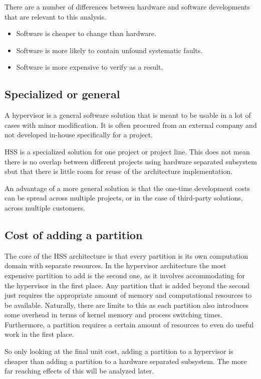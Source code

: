 There are a number of differences between hardware and software developments that are relevant to this analysis.
\begin{itemize}
\item Software is cheaper to change than hardware. 
\item Software is more likely to contain unfound systematic faults.
\item Software is more expensive to verify as a result.
\end{itemize}
\subsection{Specialized or general}
A hypervisor is a general software solution that is meant to be usable in a lot of cases with minor modification. It is often procured from an external company and not developed in-house specifically for a project.

\gls{HSS} is a specialized solution for one project or project line. This does not mean there is no overlap between different projects using hardware separated subsystem sbut that there is little room for reuse of the architecture implementation.

An advantage of a more general solution is that the one-time development costs can be spread across multiple projects, or in the case of third-party solutions, across multiple customers.   
\subsection{Cost of adding a partition}
The core of the \gls{HSS} architecture is that every partition is its own computation domain with separate resources. In the hypervisor architecture the most expensive partition to add is the second one, as it involves accommodating for the hypervisor in the first place. Any partition that is added beyond the second just requires the appropriate amount of memory and computational resources to be available. Naturally, there are limits to this as each partition also introduces some overhead in terms of kernel memory and process switching times.  Furthermore, a partition requires a certain amount of resources to even do useful work in the first place.

So only looking at the final unit cost, adding a partition to a hypervisor is cheaper than adding a partition to a hardware separated subsystem. The more far reaching effects of this will be analyzed later.

